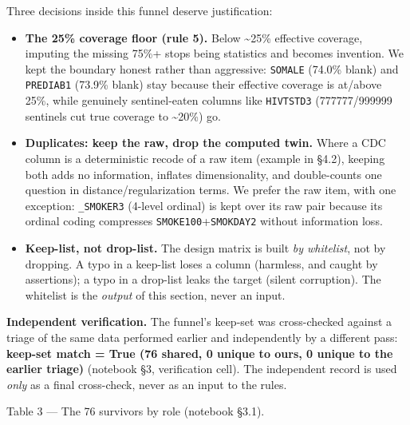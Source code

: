 \documentclass[11pt,a4paper]{article}
\providecommand{\tightlist}{\setlength{\itemsep}{2pt}\setlength{\parskip}{0pt}}
\begin{document}
{{}

Three decisions inside this funnel deserve justification:

\begin{itemize}
\tightlist
\item
  \textbf{The 25\% coverage floor (rule 5).} Below \textasciitilde25\% effective coverage, imputing the missing 75\%+ stops being statistics and becomes invention. We kept the boundary honest rather than aggressive: \texttt{SOMALE} (74.0\% blank) and \texttt{PREDIAB1} (73.9\% blank) stay because their effective coverage is at/above 25\%, while genuinely sentinel-eaten columns like \texttt{HIVTSTD3} (777777/999999 sentinels cut true coverage to \textasciitilde20\%) go.
\item
  \textbf{Duplicates: keep the raw, drop the computed twin.} Where a CDC column is a deterministic recode of a raw item (example in \S{}4.2), keeping both adds no information, inflates dimensionality, and double-counts one question in distance/regularization terms. We prefer the raw item, with one exception: \texttt{\_SMOKER3} (4-level ordinal) is kept over its raw pair because its ordinal coding compresses \texttt{SMOKE100}+\texttt{SMOKDAY2} without information loss.
\item
  \textbf{Keep-list, not drop-list.} The design matrix is built \emph{by whitelist}, not by dropping. A typo in a keep-list loses a column (harmless, and caught by assertions); a typo in a drop-list leaks the target (silent corruption). The whitelist is the \emph{output} of this section, never an input.
\end{itemize}

\textbf{Independent verification.} The funnel's keep-set was cross-checked against a triage of the same data performed earlier and independently by a different pass: \textbf{keep-set match = True (76 shared, 0 unique to ours, 0 unique to the earlier triage)} (notebook \S{}3, verification cell). The independent record is used \emph{only} as a final cross-check, never as an input to the rules.

Table 3 --- The 76 survivors by role (notebook \S{}3.1).

{\def\LTcaptype{none} %

}}
\end{document}
